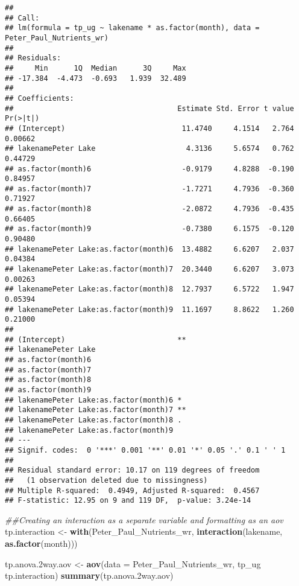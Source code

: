 \documentclass[]{article}
\newenvironment{Shaded}{\begin{snugshade}}{\end{snugshade}}
\newcommand{\CommentTok}[1]{\textcolor[rgb]{0.56,0.35,0.01}{\textit{#1}}}
\newcommand{\DataTypeTok}[1]{\textcolor[rgb]{0.13,0.29,0.53}{#1}}
\newcommand{\FloatTok}[1]{\textcolor[rgb]{0.00,0.00,0.81}{#1}}
\newcommand{\KeywordTok}[1]{\textcolor[rgb]{0.13,0.29,0.53}{\textbf{#1}}}
\newcommand{\NormalTok}[1]{#1}
\newcommand{\OperatorTok}[1]{\textcolor[rgb]{0.81,0.36,0.00}{\textbf{#1}}}
\newcommand{\StringTok}[1]{\textcolor[rgb]{0.31,0.60,0.02}{#1}}
\begin{document}
\begin{verbatim}
## 
## Call:
## lm(formula = tp_ug ~ lakename * as.factor(month), data = Peter_Paul_Nutrients_wr)
## 
## Residuals:
##     Min      1Q  Median      3Q     Max 
## -17.384  -4.473  -0.693   1.939  32.489 
## 
## Coefficients:
##                                      Estimate Std. Error t value Pr(>|t|)
## (Intercept)                           11.4740     4.1514   2.764  0.00662
## lakenamePeter Lake                     4.3136     5.6574   0.762  0.44729
## as.factor(month)6                     -0.9179     4.8288  -0.190  0.84957
## as.factor(month)7                     -1.7271     4.7936  -0.360  0.71927
## as.factor(month)8                     -2.0872     4.7936  -0.435  0.66405
## as.factor(month)9                     -0.7380     6.1575  -0.120  0.90480
## lakenamePeter Lake:as.factor(month)6  13.4882     6.6207   2.037  0.04384
## lakenamePeter Lake:as.factor(month)7  20.3440     6.6207   3.073  0.00263
## lakenamePeter Lake:as.factor(month)8  12.7937     6.5722   1.947  0.05394
## lakenamePeter Lake:as.factor(month)9  11.1697     8.8622   1.260  0.21000
##                                        
## (Intercept)                          **
## lakenamePeter Lake                     
## as.factor(month)6                      
## as.factor(month)7                      
## as.factor(month)8                      
## as.factor(month)9                      
## lakenamePeter Lake:as.factor(month)6 * 
## lakenamePeter Lake:as.factor(month)7 **
## lakenamePeter Lake:as.factor(month)8 . 
## lakenamePeter Lake:as.factor(month)9   
## ---
## Signif. codes:  0 '***' 0.001 '**' 0.01 '*' 0.05 '.' 0.1 ' ' 1
## 
## Residual standard error: 10.17 on 119 degrees of freedom
##   (1 observation deleted due to missingness)
## Multiple R-squared:  0.4949, Adjusted R-squared:  0.4567 
## F-statistic: 12.95 on 9 and 119 DF,  p-value: 3.24e-14
\end{verbatim}

\begin{Shaded}
\begin{Highlighting}[]
\CommentTok{##Creating an interaction as a separate variable and formatting as an aov}
\NormalTok{tp.interaction <-}\StringTok{ }\KeywordTok{with}\NormalTok{(Peter_Paul_Nutrients_wr, }\KeywordTok{interaction}\NormalTok{(lakename, }\KeywordTok{as.factor}\NormalTok{(month)))}
                       
\NormalTok{tp.anova}\FloatTok{.2}\NormalTok{way.aov <-}\StringTok{ }\KeywordTok{aov}\NormalTok{(}\DataTypeTok{data =}\NormalTok{ Peter_Paul_Nutrients_wr, tp_ug }\OperatorTok{~}\StringTok{ }\NormalTok{tp.interaction)}
\KeywordTok{summary}\NormalTok{(tp.anova}\FloatTok{.2}\NormalTok{way.aov)}
\end{Highlighting}
\end{Shaded}
\end{document}
